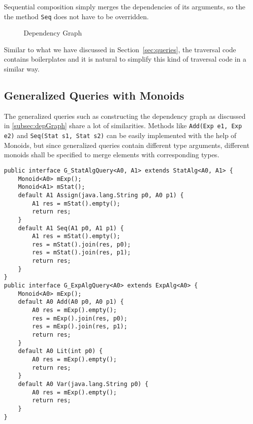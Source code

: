 Sequential composition simply merges the dependencies of its arguments, so the the method \lstinline{Seq} does not have to be overridden.


\begin{figure}[tb]
\vspace{-.1in}
\caption{Dependency Graph}
\label{deps1}
\end{figure}

Similar to what we have discussed in Section~\ref{sec:queries}, the traversal code contains boilerplates and it is natural to simplify this kind of traversal code in a similar way. 

\subsection{Generalized Queries with Monoids}\label{subsec:generalizedQuery}
The generalized queries such as constructing the dependency graph as discussed in \ref{subsec:depGraph} share a lot of similarities. Methods like \lstinline{Add(Exp e1, Exp e2)} and \lstinline{Seq(Stat s1, Stat s2)} can be easily implemented with the help of Monoids, but since generalized queries contain different type arguments, different monoids shall be specified to merge elements with corresponding types. 

\begin{comment}
\begin{lstlisting}[numbers=none]
public interface G_StatAlgQuery<A0, A1> extends StatAlg<A0, A1>, ExpAlg<A0> { 
	Monoid<A0> mExp();
	Monoid<A1> mStat();
	default A0 Add(A0 p0, A0 p1) {
		A0 res = mExp().empty();
		res = mExp().join(res, p0);
		res = mExp().join(res, p1);
		return res;
	}
	default A0 Lit(int p0) {
		A0 res = mExp().empty();
		return res;
	}
	default A0 Var(java.lang.String p0) {
		A0 res = mExp().empty();
		return res;
	}
	default A1 Assign(java.lang.String p0, A0 p1) {
		A1 res = mStat().empty();
		return res;
	}
	default A1 Seq(A1 p0, A1 p1) {
		A1 res = mStat().empty();
		res = mStat().join(res, p0);
		res = mStat().join(res, p1);
		return res;
	}
}
\end{lstlisting}
\end{comment}


\begin{lstlisting}[numbers=none]
public interface G_StatAlgQuery<A0, A1> extends StatAlg<A0, A1> {
	Monoid<A0> mExp();
	Monoid<A1> mStat();
	default A1 Assign(java.lang.String p0, A0 p1) {
		A1 res = mStat().empty();
		return res;
	}
	default A1 Seq(A1 p0, A1 p1) {
		A1 res = mStat().empty();
		res = mStat().join(res, p0);
		res = mStat().join(res, p1);
		return res;
	}
}
public interface G_ExpAlgQuery<A0> extends ExpAlg<A0> {
	Monoid<A0> mExp();
	default A0 Add(A0 p0, A0 p1) {
		A0 res = mExp().empty();
		res = mExp().join(res, p0);
		res = mExp().join(res, p1);
		return res;
	}
	default A0 Lit(int p0) {
		A0 res = mExp().empty();
		return res;
	}
	default A0 Var(java.lang.String p0) {
		A0 res = mExp().empty();
		return res;
	}
}
\end{lstlisting}

